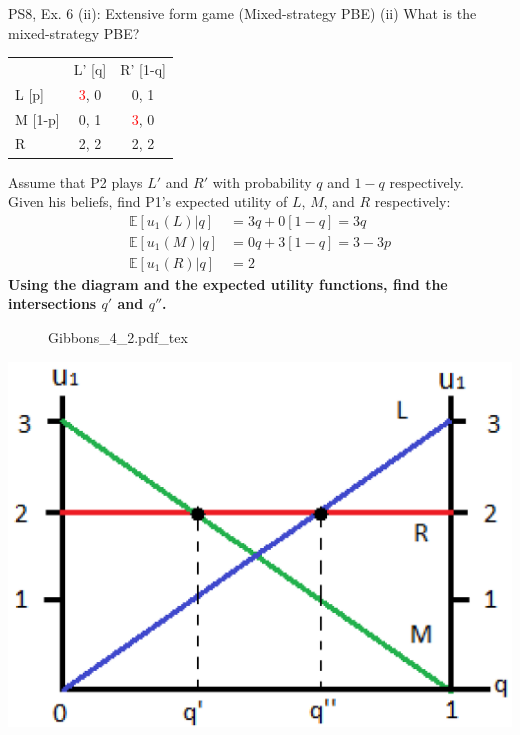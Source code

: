 \begin{frame}{PS8, Ex. 6 (ii): Extensive form game (Mixed-strategy PBE)}
    (ii) What is the mixed-strategy PBE? \vspace{-8pt}
    \begin{multicols}{2}
      \begin{table}
        \begin{tabular}{l|c|c|}
          \multicolumn{1}{c}{} & \multicolumn{1}{c}{L' [q]} & \multicolumn{1}{c}{R' [1-q]} \\\cline{2-3}
          L [p]   & \textcolor{red}{3}, 0 & 0, \color{blue}1 \\\cline{2-3}
          M [1-p] & 0, \color{blue}1 & \textcolor{red}{3}, 0 \\\cline{2-3}
          R       & 2, \color{blue}2 & 2, \color{blue}2 \\\cline{2-3}
        \end{tabular}
      \end{table} \vspace{-4pt}
      Assume that P2 plays $L'$ and $R'$ with probability $q$ and $1-q$ respectively.\\\smallskip
      Given his beliefs, find P1's expected utility of $L$, $M$, and $R$ respectively: \vspace{-4pt}
      \begin{align*}
        \mathbb{E}[u_1(L)|q]&=3q+0[1-q]=3q\\
        \mathbb{E}[u_1(M)|q]&=0q+3[1-q]=3-3p\\
        \mathbb{E}[u_1(R)|q]&=2
      \end{align*}
      \textbf{Using the diagram and the expected utility functions, find the intersections $q'$ and $q''$.}
      \vfill\null\columnbreak
      \begin{figure}[!h]
        \center {}
        {Gibbons_4_2.pdf_tex}
      \end{figure}
      \includegraphics[width=1.1\columnwidth]{figures/Gibbons_4_2_E[u]}
      \vfill\null
    \end{multicols}
\end{frame}
